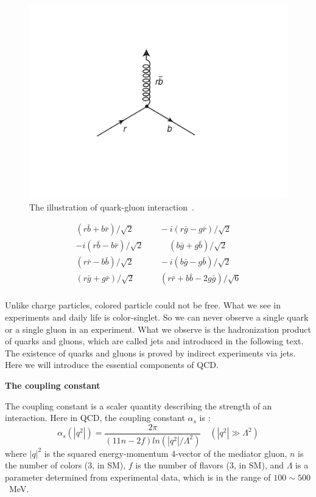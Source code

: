 \begin{figure}[htb]
\centering
\includegraphics[width=.7\textwidth]{figures/rbcolor.png}
\caption{The illustration of quark-gluon interaction~\cite{particlebook1}.}
\label{fig:color_rb}
\end{figure}  

\begin{equation}
\begin{split}
(r\bar{b} + b\bar{r})/\sqrt{2}  \quad \quad \quad -i(r\bar{g}-g\bar{r})/\sqrt{2} \\
-i(r\bar{b}-b\bar{r})/\sqrt{2}   \quad \quad  \quad  (b\bar{g} + g\bar{b})/\sqrt{2} \\
(r\bar{r} - b\bar{b})/\sqrt{2}   \quad \quad  \quad  -i(b\bar{g} - g\bar{b})/\sqrt{2} \\
(r\bar{g} + g\bar{r})/\sqrt{2}   \quad \quad   \quad (r\bar{r} + b\bar{b} -2g\bar{g})/\sqrt{6} \\
\end{split}
\label{eq:8colors}
\end{equation}


Unlike charge particles, colored particle could not be free. What we see in experiments and daily life is 
color-singlet. So we can never observe a single quark or a single gluon 
in an experiment. 
What we observe is the hadronization product of quarks and gluons, which are
called jets and introduced in the following text. The existence of quarks and gluons is proved by indirect experiments via jets. 
Here we will introduce the essential components of QCD. 

{\bf The coupling constant}

The coupling constant is a scaler quantity describing the strength of an interaction. 
Here in QCD, the coupling constant $\alpha_{s}$ is :
\begin{equation}
\alpha_{s}(|q^2|) = \frac{2\pi}{(11n-2f)ln(|q^2|/\Lambda^2)}   \quad (|q^2| \gg \Lambda^2)
\label{equation:coupling}
\end{equation}
where  $|q|^2$ is the squared energy-momentum 4-vector of the mediator gluon, $n$ is the number of colors (3, in SM), 
$f$ is the number of flavors (3, in SM), and $\Lambda$ is a parameter determined from 
experimental data, which is in the range of $100 {\sim} 500$~MeV. 

